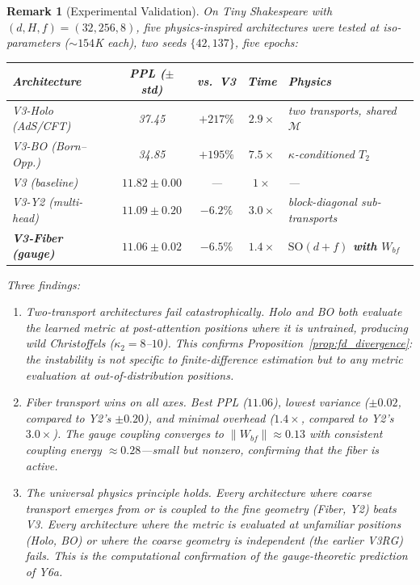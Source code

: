 \documentclass[11pt,letterpaper]{article}
\newtheorem{remark}[conjecture]{Remark}
\newcommand{\SO}{\mathrm{SO}}
\begin{document}
\begin{remark}[Experimental 
Validation]\label{rem:fiber_experiment}
On Tiny Shakespeare with $(d, H, f) = (32, 256, 8)$, five 
physics-inspired architectures were tested at iso-parameters 
($\sim\!154$K each), two seeds $\{42, 137\}$, five epochs:

\medskip
\begin{center}
\begin{tabular}{lcccl}
\toprule
\textbf{Architecture} & \textbf{PPL ($\pm$ std)} 
& \textbf{vs.\ V3} & \textbf{Time} & \textbf{Physics} \\
\midrule
V3-Holo (AdS/CFT) & 37.45 & $+217\%$ & $2.9\times$ 
& two transports, shared $\mathcal{M}$ \\
V3-BO (Born--Opp.) & 34.85 & $+195\%$ & $7.5\times$ 
& $\kappa$-conditioned $T_2$ \\
\midrule
V3 (baseline) & $11.82 \pm 0.00$ & --- & $1\times$ & --- \\
V3-Y2 (multi-head) & $11.09 \pm 0.20$ & $-6.2\%$ & $3.0\times$ 
& block-diagonal sub-transports \\
\textbf{V3-Fiber (gauge)} & $\mathbf{11.06 \pm 0.02}$ 
& $\mathbf{-6.5\%}$ & $\mathbf{1.4\times}$ 
& \textbf{$\SO(d{+}f)$ with $W_{bf}$} \\
\bottomrule
\end{tabular}
\end{center}

\medskip\noindent
Three findings:
\begin{enumerate}[nosep]
    \item \emph{Two-transport architectures fail catastrophically.} 
    Holo and BO both evaluate the learned metric at post-attention 
    positions where it is untrained, producing wild Christoffels 
    ($\kappa_2 = 8$--$10$). This confirms 
    Proposition~\ref{prop:fd_divergence}: the instability is not 
    specific to finite-difference estimation but to any metric 
    evaluation at out-of-distribution positions.
    
    \item \emph{Fiber transport wins on all axes.} Best PPL 
    ($11.06$), lowest variance ($\pm 0.02$, compared to Y2's 
    $\pm 0.20$), and minimal overhead ($1.4\times$, compared to 
    Y2's $3.0\times$). The gauge coupling converges to 
    $\|W_{bf}\| \approx 0.13$ with consistent coupling energy 
    $\approx 0.28$---small but nonzero, confirming that the 
    fiber is active.
    
    \item \emph{The universal physics principle holds.} Every 
    architecture where coarse transport emerges from or is coupled 
    to the fine geometry (Fiber, Y2) beats V3. Every architecture 
    where the metric is evaluated at unfamiliar positions (Holo, 
    BO) or where the coarse geometry is independent (the earlier 
    V3RG) fails. This is the computational confirmation of the 
    gauge-theoretic prediction of Y6a.
\end{enumerate}
\end{remark}
\end{document}

